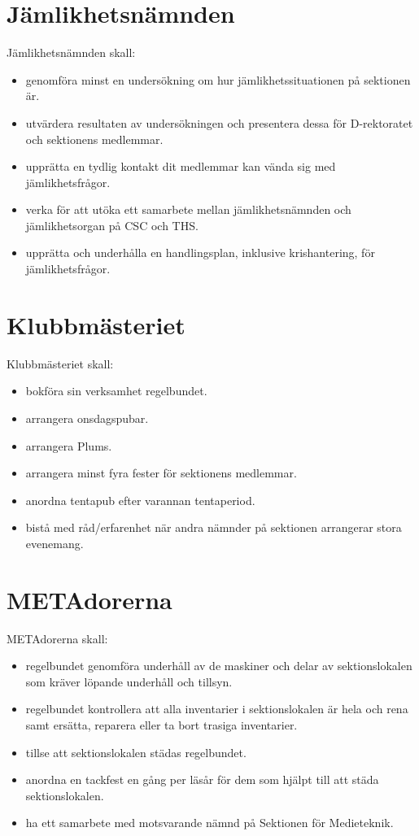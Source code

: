 \documentclass{dgovdoc}
\begin{document}
\section{Jämlikhetsnämnden}
Jämlikhetsnämnden skall:
\begin{itemize}
\item genomföra minst en undersökning om hur jämlikhetssituationen på sektionen är.
\item utvärdera resultaten av undersökningen och presentera dessa för D-rektoratet och sektionens medlemmar.
\item upprätta en tydlig kontakt dit medlemmar kan vända sig med jämlikhetsfrågor.
\item verka för att utöka ett samarbete mellan jämlikhetsnämnden och jämlikhetsorgan på CSC och THS.
\item upprätta och underhålla en handlingsplan, inklusive krishantering, för jämlikhetsfrågor.
\end{itemize}

\section{Klubbmästeriet}
Klubbmästeriet skall:
\begin{itemize}
\item bokföra sin verksamhet regelbundet.
\item arrangera onsdagspubar.
\item arrangera Plums.
\item arrangera minst fyra fester för sektionens medlemmar.
\item anordna tentapub efter varannan tentaperiod.
\item bistå med råd/erfarenhet när andra nämnder på sektionen arrangerar stora evenemang.
\end{itemize}

\section{METAdorerna}
METAdorerna skall:
\begin{itemize}
\item regelbundet genomföra underhåll av de maskiner och delar av sektionslokalen som kräver löpande underhåll och tillsyn.
\item regelbundet kontrollera att alla inventarier i sektionslokalen är hela och rena samt ersätta, reparera eller ta bort trasiga inventarier.
\item tillse att sektionslokalen städas regelbundet.
\item anordna en tackfest en gång per läsår för dem som hjälpt till att städa sektionslokalen.
\item ha ett samarbete med motsvarande nämnd på Sektionen för Medieteknik.
\end{itemize}
\end{document}

